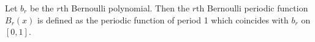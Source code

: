 \documentclass[12pt]{article}
\begin{document}
Let $b_r $ be the $r\text{th}$ Bernoulli polynomial. Then the $r\mbox{th}$ Bernoulli periodic function $B_r(x)$ is defined as the periodic function of period 1 which coincides with $b_r$ on $[0,1]$.
\end{document}

